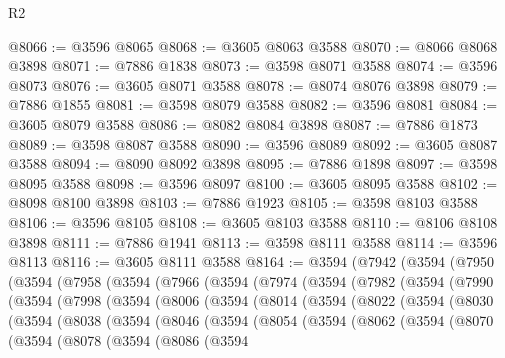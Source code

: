 \begin{lexlean}{R2}
\begin{coremodule}
@8066 := @3596 @8065
@8068 := @3605 @8063 @3588
@8070 := @8066 @8068 @3898
@8071 := @7886 @1838
@8073 := @3598 @8071 @3588
@8074 := @3596 @8073
@8076 := @3605 @8071 @3588
@8078 := @8074 @8076 @3898
@8079 := @7886 @1855
@8081 := @3598 @8079 @3588
@8082 := @3596 @8081
@8084 := @3605 @8079 @3588
@8086 := @8082 @8084 @3898
@8087 := @7886 @1873
@8089 := @3598 @8087 @3588
@8090 := @3596 @8089
@8092 := @3605 @8087 @3588
@8094 := @8090 @8092 @3898
@8095 := @7886 @1898
@8097 := @3598 @8095 @3588
@8098 := @3596 @8097
@8100 := @3605 @8095 @3588
@8102 := @8098 @8100 @3898
@8103 := @7886 @1923
@8105 := @3598 @8103 @3588
@8106 := @3596 @8105
@8108 := @3605 @8103 @3588
@8110 := @8106 @8108 @3898
@8111 := @7886 @1941
@8113 := @3598 @8111 @3588
@8114 := @3596 @8113
@8116 := @3605 @8111 @3588
@8164 := @3594
    (@7942
      (@3594
        (@7950
          (@3594
            (@7958
              (@3594
                (@7966
                  (@3594
                    (@7974
                      (@3594
                        (@7982
                          (@3594
                            (@7990
                              (@3594
                                (@7998
                                  (@3594
                                    (@8006
                                      (@3594
                                        (@8014
                                          (@3594
                                            (@8022
                                              (@3594
                                                (@8030
                                                  (@3594
                                                    (@8038
                                                      (@3594
                                                        (@8046
                                                          (@3594
                                                            (@8054
                                                              (@3594
                                                                (@8062
                                                                  (@3594
                                                                    (@8070
                                                                      (@3594
                                                                        (@8078
                                                                          (@3594
                                                                            (@8086
                                                                              (@3594

\end{coremodule}
\end{lexlean}
